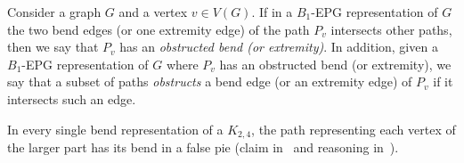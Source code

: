 \documentclass[runningheads]{llncs}
\begin{document}




\vspace{-0.5cm}
\begin{definition}
Consider a graph $G$ and a vertex $v \in V(G)$. If in a $B_1$-EPG representation of $G$ the two bend edges (or one extremity edge) of the path $P_{v}$ intersects other paths, then we say that $P_{v}$ has an \emph{obstructed bend (or extremity)}. 
In addition, given a $B_1$-EPG representation of $G$ where $P_{v}$ has an obstructed bend (or extremity), we say that a subset of paths \emph{obstructs} a bend edge (or an extremity edge) of $P_{v}$ if it intersects such an edge. 
\end{definition}


\begin{remark} \label{fact:k24facts}
In every single bend representation of a $K_{2,4}$, the path representing each vertex of the larger part has its bend in a false pie (claim in~\cite{daniel2014b} and reasoning in~\cite{Asinowski2009}).
\end{remark} %




\end{document}

